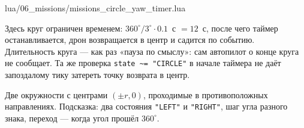 \begin{codefile}{lua/06_missions/missions_circle_yaw_timer.lua}
\end{codefile}

Здесь круг ограничен временем: $360^\circ / 3^\circ \cdot 0.1$~с $= 12$~с, после чего таймер останавливается, дрон возвращается в центр и садится по событию. Длительность круга --- как раз «пауза по смыслу»: сам автопилот о конце круга не сообщает. Та же проверка \verb|state ~= "CIRCLE"| в начале таймера не даёт запоздалому тику затереть точку возврата в центр.

\begin{taskbox}[Восьмёрка]
Две окружности с центрами $(\pm r, 0)$, проходимые в противоположных направлениях. Подсказка: два состояния \verb|"LEFT"| и \verb|"RIGHT"|, шаг угла разного знака, переход --- когда угол прошёл $360^\circ$.
\end{taskbox}
